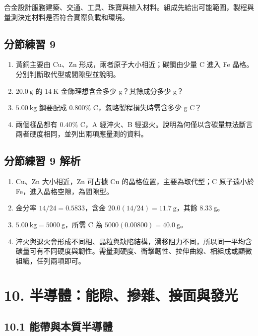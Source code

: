 \documentclass[11pt,a4paper]{article}
\providecommand{\tightlist}{%
  \setlength{\itemsep}{0pt}\setlength{\parskip}{0pt}}
\begin{document}
合金設計服務建築、交通、工具、珠寶與植入材料。組成先給出可能範圍，製程與量測決定材料是否符合實際負載和環境。

\subsection{分節練習 9}\label{ux5206ux7bc0ux7df4ux7fd2-9}

\begin{enumerate}
\def\labelenumi{\arabic{enumi}.}
\tightlist
\item
  黃銅主要由 Cu、Zn 形成，兩者原子大小相近；碳鋼由少量 C 進入 Fe 晶格。分別判斷取代型或間隙型並說明。
\item
  \(20.0\ \mathrm{g}\) 的 \(14\ \mathrm{K}\) 金飾理想含金多少 g？其餘成分多少 g？
\item
  \(5.00\ \mathrm{kg}\) 鋼要配成 \(0.800\%\) C，忽略製程損失時需含多少 g C？
\item
  兩個樣品都有 \(0.40\%\) C，A 經淬火、B 經退火。說明為何僅以含碳量無法斷言兩者硬度相同，並列出兩項應量測的資料。
\end{enumerate}

\subsection{分節練習 9 解析}\label{ux5206ux7bc0ux7df4ux7fd2-9-ux89e3ux6790}

\begin{enumerate}
\def\labelenumi{\arabic{enumi}.}
\tightlist
\item
  Cu、Zn 大小相近，Zn 可占據 Cu 的晶格位置，主要為取代型；C 原子遠小於 Fe，進入晶格空隙，為間隙型。
\item
  金分率 \(14/24=0.5833\)，含金 \(20.0(14/24)=11.7\ \mathrm{g}\)，其餘 \(8.33\ \mathrm{g}\)。
\item
  \(5.00\ \mathrm{kg}=5000\ \mathrm{g}\)，所需 C 為 \(5000(0.00800)=40.0\ \mathrm{g}\)。
\item
  淬火與退火會形成不同相、晶粒與缺陷結構，滑移阻力不同，所以同一平均含碳量可有不同硬度與韌性。需量測硬度、衝擊韌性、拉伸曲線、相組成或顯微組織，任列兩項即可。
\end{enumerate}

\section{10. 半導體：能隙、摻雜、接面與發光}\label{ux534aux5c0eux9ad4ux80fdux9699ux647bux96dcux63a5ux9762ux8207ux767cux5149}

\subsection{10.1 能帶與本質半導體}\label{ux80fdux5e36ux8207ux672cux8ceaux534aux5c0eux9ad4}
\end{document}
